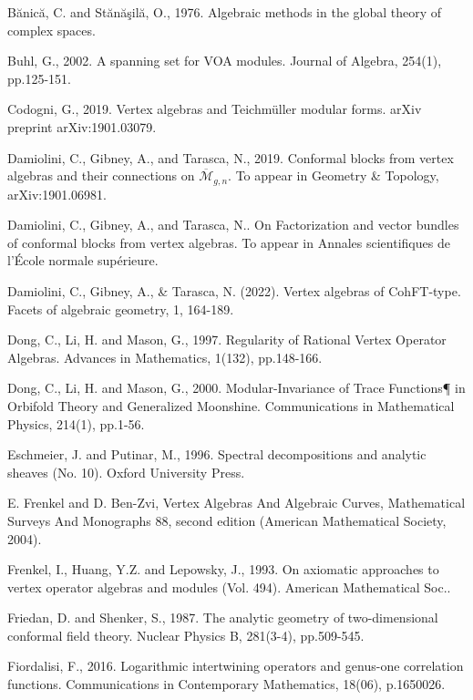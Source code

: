 \documentclass[12pt,a4paper,notitlepage]{article}
\theoremstyle{definition}
\theoremstyle{plain}
\newcommand{\mc}{\mathcal}
\newcommand{\ovl}{\overline}
\numberwithin{equation}{section}
\begin{document}
\begin{thebibliography}{999999}
		Bănică, C. and Stănăşilă, O., 1976. Algebraic methods in the global theory of complex spaces.
		
		Buhl, G., 2002. A spanning set for VOA modules. Journal of Algebra, 254(1), pp.125-151.
		
Codogni, G., 2019. Vertex algebras and Teichm\"uller modular forms. arXiv preprint arXiv:1901.03079.		
		
	Damiolini, C., Gibney, A., and Tarasca, N., 2019. Conformal blocks from vertex algebras and their connections on $\ovl{\mc M}_{g,n}$.  To appear in Geometry \& Topology, arXiv:1901.06981.
	
Damiolini, C., Gibney, A., and Tarasca, N.. On Factorization and vector bundles of conformal blocks from vertex algebras. To appear in Annales scientifiques de l’École normale supérieure.

Damiolini, C., Gibney, A., \& Tarasca, N. (2022). Vertex algebras of CohFT-type. Facets of algebraic geometry, 1, 164-189.
		
Dong, C., Li, H. and Mason, G., 1997. Regularity of Rational Vertex Operator Algebras. Advances in Mathematics, 1(132), pp.148-166.

Dong, C., Li, H. and Mason, G., 2000. Modular-Invariance of Trace Functions¶ in Orbifold Theory and Generalized Moonshine. Communications in Mathematical Physics, 214(1), pp.1-56.
		
		Eschmeier, J. and Putinar, M., 1996. Spectral decompositions and analytic sheaves (No. 10). Oxford University Press.
		
		E. Frenkel and D. Ben-Zvi, Vertex Algebras And Algebraic Curves, Mathematical Surveys And Monographs 88, second edition (American Mathematical Society, 2004).
		
		Frenkel, I., Huang, Y.Z. and Lepowsky, J., 1993. On axiomatic approaches to vertex operator algebras and modules (Vol. 494). American Mathematical Soc..
		
Friedan, D. and Shenker, S., 1987. The analytic geometry of two-dimensional conformal field theory. Nuclear Physics B, 281(3-4), pp.509-545.		
		
Fiordalisi, F., 2016. Logarithmic intertwining operators and genus-one correlation functions. Communications in Contemporary Mathematics, 18(06), p.1650026.		
		

\end{thebibliography}
\end{document}
